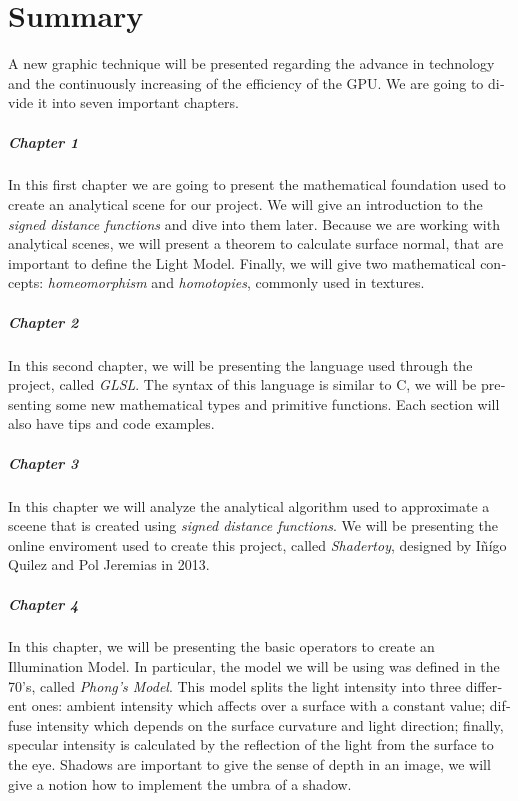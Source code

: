 \chapter*{Summary}

\begin{otherlanguage}{english}
A new graphic technique will be presented regarding the advance in technology and the continuously increasing of the efficiency of the GPU. We are going to divide it into seven important chapters.

\paragraph{Chapter 1} In this first chapter we are going to present the mathematical foundation used to create an analytical scene for our project. We will give an introduction to the \textit{signed distance functions} and dive into them later. Because we are working with analytical scenes, we will present a theorem to calculate surface normal, that are important to define the Light Model. Finally, we will give two mathematical concepts: \textit{homeomorphism} and \textit{homotopies}, commonly used in textures.

\paragraph{Chapter 2} In this second chapter, we will be presenting the language used through the project, called \textit{GLSL}. The syntax of this language is similar to C, we will be presenting some new mathematical types and primitive functions. Each section will also have tips and code examples.

\paragraph{Chapter 3} In this chapter we will analyze the analytical algorithm used to approximate a sceene that is created using \textit{signed distance functions}. We will be presenting the online enviroment used to create this project, called \textit{Shadertoy}, designed by Iñígo Quilez and Pol Jeremias in 2013.

\paragraph{Chapter 4} In this chapter, we will be presenting the basic operators to create an Illumination Model. In particular, the model we will be using was defined in the 70's, called \textit{Phong's Model}. This model splits the light intensity into three different ones: ambient intensity which affects over a surface with a constant value; diffuse intensity which depends on the surface curvature and light direction; finally, specular intensity is calculated by the reflection of the light from the surface to the eye. Shadows are important to give the sense of depth in an image, we will give a notion how to implement the umbra of a shadow.


\end{otherlanguage}
